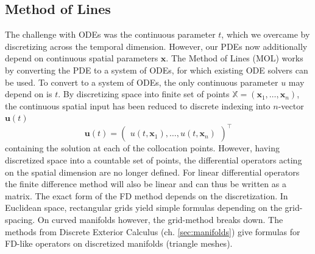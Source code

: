\subsection*{Method of Lines}
The challenge with ODEs was the continuous parameter $t$, which we overcame by discretizing across the temporal dimension. However, our PDEs now additionally depend on continuous spatial parameters $\mathbf{x}$. The Method of Lines (MOL) \cite{mol} works by converting the PDE to a system of ODEs, for which existing ODE solvers can be used. To convert to a system of ODEs, the only continuous parameter $u$ may depend on is $t$. By discretizing space into finite set of points $\mathbb{X} = (\mathbf{x}_1, \dots, \mathbf{x}_n)$, the continuous spatial input has been reduced to discrete indexing into $n$-vector $\mathbf{u}(t)$
$$\mathbf{u}(t) = \begin{pmatrix}
    u(t, \mathbf{x}_1), \dots, u(t, \mathbf{x}_n)
\end{pmatrix}^\top$$ 
containing the solution at each of the collocation points. However, having discretized space into a countable set of points, the differential operators acting on the spatial dimension are no longer defined. 
For linear differential operators the finite difference method will also be linear and can thus be written as a matrix. The exact form of the FD method depends on the discretization. In Euclidean space, rectangular grids yield simple formulas depending on the grid-spacing. On curved manifolds however, the grid-method breaks down. The methods from Discrete Exterior Calculus (ch. \ref{sec:manifolds}) give formulas for FD-like operators on discretized manifolds (triangle meshes). 

